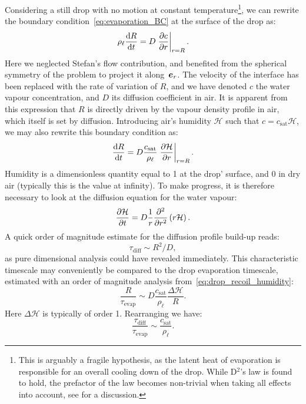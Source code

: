 Considering a still drop with no motion at constant temperature\footnote{This is arguably a fragile hypothesis, as the latent heat of evaporation is responsible for an overall cooling down of the drop. While D$^2$'s law is found to hold, the prefactor of the law becomes non-trivial when taking all effects into account, see \citet{Cazabat2010} for a discussion.}, we can rewrite the boundary condition~\eqref{eq:evaporation_BC} at the surface of the drop as:
\begin{equation}
\rho_\ell \frac{\mathrm d R}{\mathrm d t} = D \left.\frac{\partial c}{\partial r}\right|_{r=R}.
\label{eq:drop_recoil}
\end{equation}
Here we neglected Stefan's flow contribution, and benefited from the spherical symmetry of the problem to project it along~$\be_r$. The velocity of the interface has been replaced with the rate of variation of $R$, and we have denoted $c$ the water vapour concentration, and $D$ its diffusion coefficient in air. It is apparent from this expression that $R$ is directly driven by the vapour density profile in air, which itself is set by diffusion. 
Introducing air's humidity $\mathcal H$ such that $c = c_\text{sat} \mathcal H$, we may also rewrite this boundary condition as:
\begin{equation}
\frac{\mathrm d R}{\mathrm d t} = D \frac{c_\text{sat}}{\rho_\ell} \left.\frac{\partial \mathcal H}{\partial r}\right|_{r=R}.
\label{eq:drop_recoil_humidity}
\end{equation}
Humidity is a dimensionless quantity equal to 1 at the drop' surface, and 0 in dry air (typically this is the value at infinity).
To make progress, it is therefore necessary to look at the diffusion equation for the water vapour:
\begin{equation}
\frac{\partial \mathcal H}{\partial t} = D\frac{1}{r}\frac{\partial^2}{\partial r^2}\left(r \mathcal H\right).
\label{eq:water_vapour_diffusion}
\end{equation}
A quick order of magnitude estimate for the diffusion profile build-up reads:
$$
\tau_\text{diff} \sim R^2/D,
$$
as pure dimensional analysis could have revealed immediately. This characteristic timescale may conveniently be compared to the drop evaporation timescale, estimated with an order of magnitude analysis from~\eqref{eq:drop_recoil_humidity}:
\begin{equation}
\frac{R}{\tau_\text{evap}} \sim D \frac{c_\text{sat}}{\rho_\ell} \frac{\Delta \mathcal H}{R}.
\label{eq:evaporation_quick_estimate}
\end{equation}
Here $\Delta \mathcal H$ is typically of order 1. Rearranging we have:
$$
\frac{\tau_\text{diff}}{\tau_\text{evap}} \sim\frac{c_\text{sat}}{\rho_\ell}.
$$
